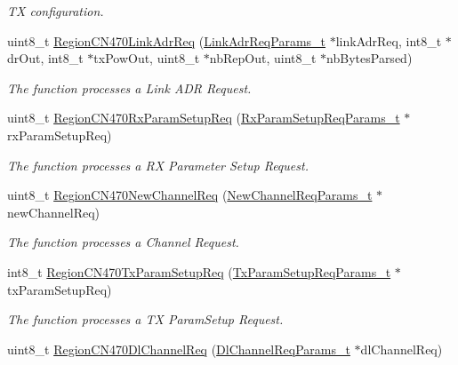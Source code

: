 \begin{DoxyCompactItemize}
\begin{DoxyCompactList}\small\item\em TX configuration. \end{DoxyCompactList}\item 
uint8\+\_\+t \mbox{\hyperlink{group___r_e_g_i_o_n_c_n470_ga8390f178b68e708cd9741caba00cb05d}{Region\+C\+N470\+Link\+Adr\+Req}} (\mbox{\hyperlink{group___r_e_g_i_o_n_gad4af503e8d4de1846129e26a799a1e8e}{Link\+Adr\+Req\+Params\+\_\+t}} $\ast$link\+Adr\+Req, int8\+\_\+t $\ast$dr\+Out, int8\+\_\+t $\ast$tx\+Pow\+Out, uint8\+\_\+t $\ast$nb\+Rep\+Out, uint8\+\_\+t $\ast$nb\+Bytes\+Parsed)
\begin{DoxyCompactList}\small\item\em The function processes a Link A\+DR Request. \end{DoxyCompactList}\item 
uint8\+\_\+t \mbox{\hyperlink{group___r_e_g_i_o_n_c_n470_gae6be53827b6148fa40a6c1a3f6a8058b}{Region\+C\+N470\+Rx\+Param\+Setup\+Req}} (\mbox{\hyperlink{group___r_e_g_i_o_n_ga7165f282c670c728c36d534df2285157}{Rx\+Param\+Setup\+Req\+Params\+\_\+t}} $\ast$rx\+Param\+Setup\+Req)
\begin{DoxyCompactList}\small\item\em The function processes a RX Parameter Setup Request. \end{DoxyCompactList}\item 
uint8\+\_\+t \mbox{\hyperlink{group___r_e_g_i_o_n_c_n470_ga3db01af8efb6f0c07db00b78dcb2ebfe}{Region\+C\+N470\+New\+Channel\+Req}} (\mbox{\hyperlink{group___r_e_g_i_o_n_gae2abcdb6dbb843c9faf5fd3009eca9d6}{New\+Channel\+Req\+Params\+\_\+t}} $\ast$new\+Channel\+Req)
\begin{DoxyCompactList}\small\item\em The function processes a Channel Request. \end{DoxyCompactList}\item 
int8\+\_\+t \mbox{\hyperlink{group___r_e_g_i_o_n_c_n470_ga26c513769fa09c8bd92f15805162860b}{Region\+C\+N470\+Tx\+Param\+Setup\+Req}} (\mbox{\hyperlink{group___r_e_g_i_o_n_ga26836ef2996e70410e42ef471073f855}{Tx\+Param\+Setup\+Req\+Params\+\_\+t}} $\ast$tx\+Param\+Setup\+Req)
\begin{DoxyCompactList}\small\item\em The function processes a TX Param\+Setup Request. \end{DoxyCompactList}\item 
uint8\+\_\+t \mbox{\hyperlink{group___r_e_g_i_o_n_c_n470_ga2fb7a7dcde7482f3a0da9028090c9c7f}{Region\+C\+N470\+Dl\+Channel\+Req}} (\mbox{\hyperlink{group___r_e_g_i_o_n_gae0d608ff1f8ea0a430e4f9a4c38ec7f3}{Dl\+Channel\+Req\+Params\+\_\+t}} $\ast$dl\+Channel\+Req)

\end{DoxyCompactItemize}
